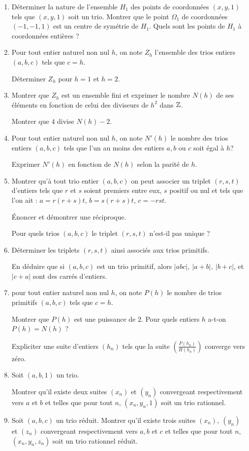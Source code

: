 \begin{enumerate}
\item Déterminer la nature de l'ensemble $H_1$ des points de coordonnées
$(x, y, 1)$ tels que $(x, y, 1)$ soit un trio.  Montrer que le point $\Omega_1$
de coordonnées $(-1,-1,1)$ est un centre de symétrie de $H_1$. Quels sont
les points de $H_1$ à coordonnées entières ?
\item Pour tout entier naturel non nul $h$, on note $Z_h$ l'ensemble des
trios entiers $(a, b, c)$ tels que $c=h$.

Déterminer $Z_h$ pour $h = 1$ et $h = 2$.
\item Montrer que $Z_h$ est un ensemble fini et exprimer le nombre $N(h)$
de ses éléments en fonction de celui des diviseurs de $h^2$ dans $\mathbb{Z}$.

Montrer que $4$ divise $N(h)-2$.
\item Pour tout entier naturel non nul $h$, on note $N'(h)$ le nombre des
trios entiers $(a, b, c)$ tels que l'un au moins des entiers $a,b$ ou $c$
soit égal à $h$?

Exprimer $N'(h)$ en fonction de $N(h)$ selon la parité de
$h$.
\item Montrer qu'à tout trio entier $(a, b, c)$ on peut associer un triplet
$(r,s,t)$ d'entiers tels que $r $ et $s$ soient premiers entre eux, $s$
positif ou nul et tels que l'on ait : $a=r(r+s)t$, $b=s(r+s)t$, $c=-rst$.

Énoncer et démontrer une réciproque. 

Pour quels trios $(a, b, c)$ le triplet
$(r, s, t)$ n'est-il pas unique ?
\item Déterminer les triplets $(r, s, t)$ ainsi associés aux trios primitifs.

En déduire que si $(a, b, c)$ est un trio primitif, alors $|abc|,\ |a + b|,\
|b + c|$, et $|c + a|$ sont des carrés d'entiers.
\item pour tout entier naturel non nul $h$, on note $P(h)$ le nombre de
trios primitifs $(a, b, c)$ tels que $c = h$.

Montrer que $P(h)$ est une puissance de $2$.  Pour quels entiers $h$ a-t-on $P(h) = N(h)$ ? 

Expliciter une suite d'entiers $(h_n)$ tels que la suite $\left(\frac
{P(h_n)}{H(h_n)}\right)$ converge vers zéro.
\item Soit $(a, b, 1)$ un trio.

Montrer qu'il existe deux suites $(x_n)$ et $(y_n)$ convergeant respectivement vers $a$ et $b$ et telles que pour tout $n$, $(x_n, y_n,1)$ soit un trio rationnel.
\item Soit $(a, b, c)$ un trio réduit.  Montrer qu'il existe trois suites
$(x_n),\ (y_n)$ et $(z_n)$ convergeant respectivement vers $a, b$ et $c$ et
telles que pour tout $n$, $(x_n, y_n, z_n)$ soit un trio rationnel réduit.
\end{enumerate}

